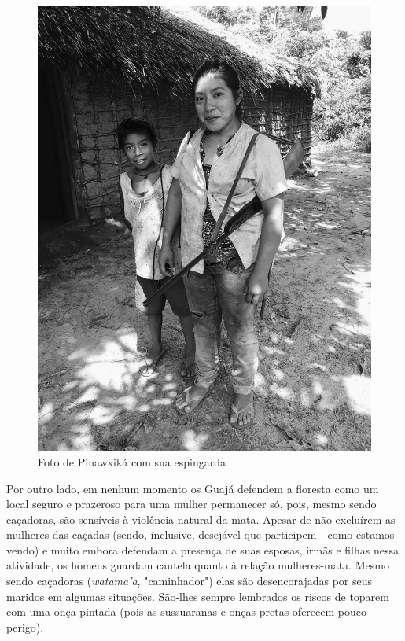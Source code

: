 \begin{figure}[H]
\centering
  \includegraphics[width=\textwidth]{./imgs/IMG_4463}
\caption{Foto de Pinawxiká com sua espingarda}
\end{figure}

Por outro lado, em nenhum momento os Guajá defendem a floresta como um
local seguro e prazeroso para uma mulher permanecer só, pois, mesmo
sendo caçadoras, são sensíveis à violência natural da mata. Apesar de
não excluírem as mulheres das caçadas (sendo, inclusive, desejável que
participem - como estamos vendo) e muito embora defendam a presença de
suas esposas, irmãs e filhas nessa atividade, os homens guardam cautela
quanto à relação mulheres-mata. Mesmo sendo caçadoras (\emph{watama'a},
"caminhador") elas são desencorajadas por seus maridos em algumas
situações. São-lhes sempre lembrados os riscos de toparem com uma
onça-pintada (pois as sussuaranas e onças-pretas oferecem pouco perigo).

